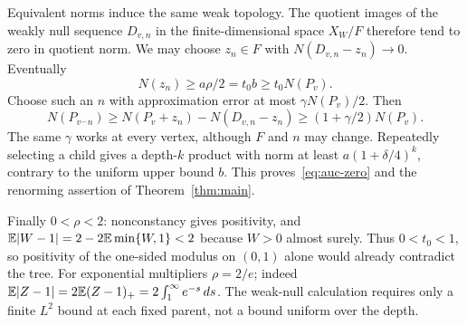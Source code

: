 Equivalent norms induce the same weak topology. The quotient images of the
weakly null sequence $D_{v,n}$ in the finite-dimensional space $X_W/F$
therefore tend to zero in quotient norm. We may choose $z_n\in F$ with
$N(D_{v,n}-z_n)\to0$. Eventually
\[
 N(z_n)\ge a\rho/2=t_0b\ge t_0N(P_v).
\]
Choose such an $n$ with approximation error at most $\gamma N(P_v)/2$.
Then
\[
 N(P_{v^\frown n})
 \ge N(P_v+z_n)-N(D_{v,n}-z_n)
 \ge(1+\gamma/2)N(P_v).
\]
The same $\gamma$ works at every vertex, although $F$ and $n$ may change.
Repeatedly selecting a child gives a depth-$k$ product with norm at least
$a(1+\delta/4)^k$, contrary to the uniform upper bound $b$.
This proves~\eqref{eq:auc-zero} and the renorming assertion of
Theorem~\ref{thm:main}.

Finally $0<\rho<2$: nonconstancy gives positivity, and
$\mathbb E|W-1|=2-2\mathbb E\min\{W,1\}<2$ because $W>0$ almost surely.
Thus $0<t_0<1$, so positivity of the one-sided modulus on $(0,1)$ alone
would already contradict the tree. For exponential multipliers
$\rho=2/e$; indeed $\mathbb E|Z-1|=2\mathbb E(Z-1)_+=2\int_1^\infty e^{-s}\,ds$.
The weak-null calculation requires only a finite $L^2$ bound at each
fixed parent, not a bound uniform over the depth.
